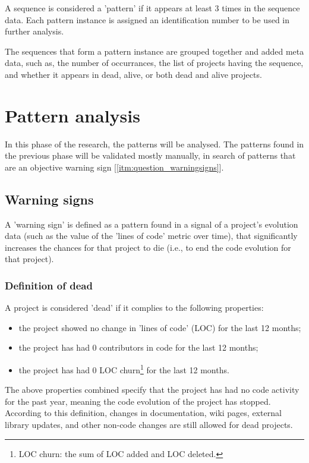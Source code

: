 A sequence is considered a 'pattern' if it appears at least 3 times in the
sequence data. Each pattern instance is assigned an identification number to be
used in further analysis.

The sequences that form a pattern instance are grouped together and added meta
data, such as, the number of occurrances, the list of projects having the
sequence, and whether it appears in dead, alive, or both dead and alive
projects.



\section{Pattern analysis}
In this phase of the research, the patterns will be analysed. The patterns found
in the previous phase will be validated mostly manually, in search of patterns
that are an objective warning sign [\ref{itm:question_warningsigns}].

\subsection{Warning signs}
A 'warning sign' is defined as a pattern found in a signal of a project's
evolution data (such as the value of the 'lines of code' metric over time), that
significantly increases the chances for that project to die (i.e., to end the
code evolution for that project).

\subsubsection{Definition of dead}
\label{def:dead}
A project is considered 'dead' if it complies to the following properties:
\begin{itemize}
	\item the project showed no change in 'lines of code' (LOC) for the last 12
	months;
	\item the project has had 0 contributors in code for the last 12 months;
	\item the project has had 0 LOC churn\footnote{LOC churn: the sum of LOC added
	and LOC deleted.} for the last 12 months.
\end{itemize}

\noindent
The above properties combined specify that the project has had no code activity
for the past year, meaning the code evolution of the project has stopped.
According to this definition, changes in documentation, wiki pages, external
library updates, and other non-code changes are still allowed for dead
projects.

